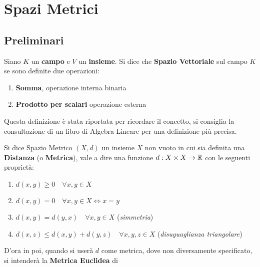 \chapter{Spazi Metrici}

\section{Preliminari}

\begin{definition}
	Siano $K$ un \textbf{campo} e $V$ un \textbf{insieme}. Si dice che \textbf{Spazio Vettoriale} sul campo $K$ se sono definite due operazioni:
	\begin{enumerate}
		\item \textbf{Somma}, operazione interna binaria
		\item \textbf{Prodotto per scalari} operazione esterna
	\end{enumerate}
	\begin{note}
		Questa definizione è stata riportata per ricordare il concetto, si consiglia la consultazione di un libro di Algebra Lineare per una definizione più precisa.
	\end{note}
\end{definition}

\begin{definition}
	\label{def:sp_metrico}
	Si dice Spazio Metrico $(X,d)$ un insieme $X$ non vuoto in cui sia definita una \textbf{Distanza} (o \textbf{Metrica}), vale a dire una funzione $d: X \times X \to \mathbb{R}$ con le seguenti proprietà:
	\begin{enumerate}
		\item $d(x,y) \geq 0 \quad \forall x,y \in X$
		\item \label{itm:dist_0_iff_x_uguale_y} $d(x,y) = 0 \quad \forall x,y \in X \iff x=y$
		\item $d(x,y) = d(y,x) \quad \forall x,y \in X$ \quad(\textit{simmetria})
		\item $d(x,z) \leq d(x,y)+d(y,z) \quad \forall x,y,z\in X$ \quad(\textit{disuguaglianza triangolare})
	\end{enumerate}
	\begin{note}
		D'ora in poi, quando si userà $d$ come metrica, dove non diversamente specificato, si intenderà la \textbf{Metrica Euclidea} di \hyperref[ex:dist_eucl]{} %
	\end{note}
\end{definition}

